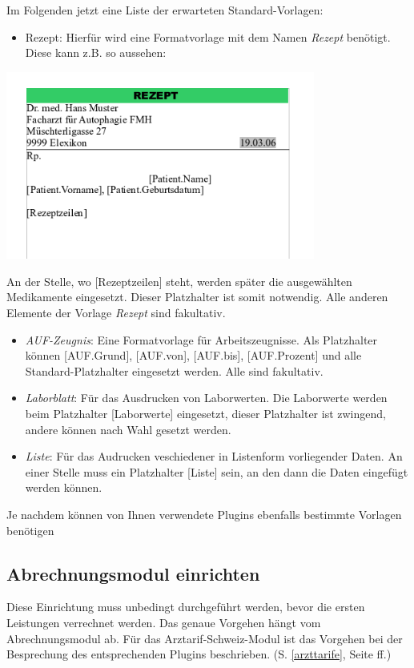 Im Folgenden jetzt eine Liste der erwarteten Standard-Vorlagen:

\begin{itemize}
\item Rezept: Hierfür wird eine Formatvorlage mit dem Namen \textit{Rezept} benötigt. Diese kann z.B. so aussehen:
 \end{itemize}
\includegraphics[width=4in]{images/rezept.png}

An der Stelle, wo [Rezeptzeilen] steht, werden später die ausgewählten Medikamente eingesetzt. Dieser Platzhalter ist somit notwendig. Alle anderen Elemente der Vorlage \textit{Rezept} sind fakultativ.

\begin{itemize}
 \item \textit{AUF-Zeugnis}: Eine Formatvorlage für Arbeitszeugnisse. Als Platzhalter können [AUF.Grund], [AUF.von], [AUF.bis], [AUF.Prozent] und alle Standard-Platzhalter eingesetzt werden. Alle sind fakultativ.


 \item \textit{Laborblatt}: Für das Ausdrucken von Laborwerten. Die Laborwerte werden beim Platzhalter [Laborwerte] eingesetzt, dieser Platzhalter ist zwingend, andere können nach Wahl gesetzt werden.
 \item \textit{Liste}: Für das Audrucken veschiedener in Listenform vorliegender Daten. An einer Stelle muss ein Platzhalter [Liste] sein, an den dann die Daten eingefügt werden können.
\end{itemize}

Je nachdem können von Ihnen verwendete Plugins ebenfalls bestimmte Vorlagen benötigen

\subsection{Abrechnungsmodul einrichten}
\label{conf:abrechnung}
Diese Einrichtung muss unbedingt durchgeführt werden, bevor die ersten Leistungen verrechnet werden. Das genaue Vorgehen hängt vom Abrechnungsmodul ab. Für das Arztarif-Schweiz-Modul ist das Vorgehen bei der Besprechung des entsprechenden Plugins beschrieben. (S. \ref{arzttarife}, Seite \pageref{arzttarife} ff.)

